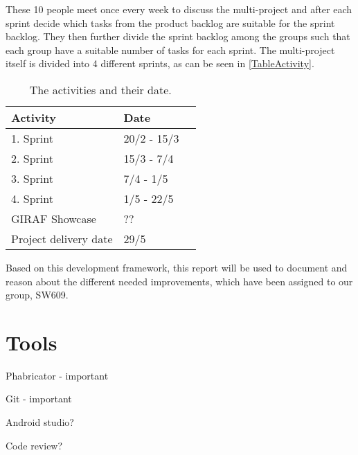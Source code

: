 
These 10 people meet once every week to discuss the multi-project and after each
sprint decide which tasks from the product backlog are suitable for the sprint
backlog. They then further divide the sprint backlog among the groups such that
each group have a suitable number of tasks for each sprint. The multi-project
itself is divided into 4 different sprints, as can be seen in
\autoref{TableActivity}. 

\begin{table}[H]
\centering
\begin{tabular}{|p{2cm}|p{3cm}|p{8cm}|}
\hline
Activity & Date \\ \hline
1. Sprint & 20/2 - 15/3 \\\hline 
2. Sprint & 15/3 - 7/4\\\hline 
3. Sprint & 7/4 - 1/5\\\hline 
4. Sprint & 1/5 - 22/5\\\hline 
GIRAF Showcase & ??\\\hline
Project delivery date & 29/5\\\hline
\end{tabular}
\caption{The activities and their date.}
\label{TableActivity}
\end{table}

Based on this development framework, this report will be used to document and
reason about the different needed improvements, which have been assigned to our
group, SW609.


\section{Tools}

Phabricator - important

Git - important

Android studio?

Code review?
